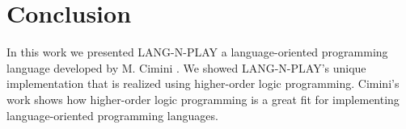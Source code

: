 
\section{Conclusion}
\label{conclusion}

In this work we presented LANG-N-PLAY a language-oriented programming language developed by M. Cimini \cite{cimini_languages_2018,cimini_lang-n-play_2018,cimini_effectiveness_2020}. We showed LANG-N-PLAY's unique implementation that is realized using higher-order logic programming. Cimini's work shows how higher-order logic programming is a great fit for implementing language-oriented programming languages.